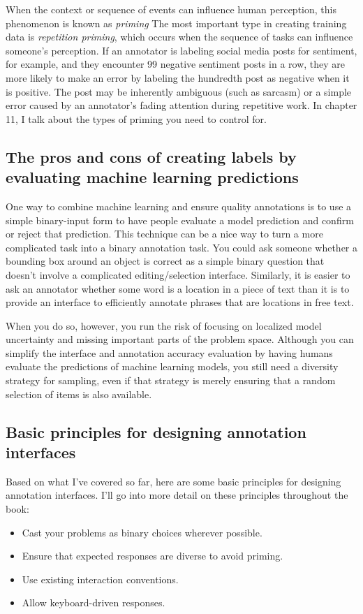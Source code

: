 \documentclass[sigconf,nonacm,screen,pbalance]{acmart}
\begin{document}
When
the context or sequence of events can influence human perception, this phenomenon is
known as {\em priming} The most important type in creating training data is
\emph{repetition priming},
which occurs when the sequence of tasks can influence someone's perception. If an
annotator is labeling social media posts for sentiment, for example, and they encounter
99 negative sentiment posts in a row, they are more likely to make an error by labeling
the hundredth post as negative when it is positive. The post may be inherently ambiguous
(such as sarcasm) or a simple error caused by an annotator's fading attention during
repetitive work. In chapter 11, I talk about the types of priming you need to control for.

\subsection{The pros and cons of creating labels by evaluating machine learning predictions}
One
way
to combine machine learning and ensure quality annotations is to use a simple
binary-input form to have people evaluate a model prediction and confirm or reject that
prediction. This technique can be a nice way to turn a more complicated task into a
binary annotation task. You could ask someone whether a bounding box around an object is
correct as a simple binary question that doesn't involve a complicated editing/selection
interface. Similarly, it is easier to ask an annotator whether some word is a location
in a piece of text than it is to provide an interface to efficiently annotate phrases
that are locations in free text.

When
you do so, however, you run the risk of focusing on localized model uncertainty and
missing important parts of the problem space. Although you can simplify the interface
and annotation accuracy evaluation by having humans evaluate the predictions of machine
learning models, you still need a diversity strategy for sampling, even if that strategy
is merely ensuring that a random selection of items is also available.

\subsection{Basic principles for designing annotation interfaces}
Based
on
what I've covered so far, here are some basic principles for designing annotation
interfaces. I'll go into more detail on these principles throughout the
book:

\begin{itemize}
     \setlength{\itemindent}{-2em}
    \item Cast your problems as binary choices wherever possible.
    \item Ensure that expected responses are diverse to avoid priming.
    \item Use existing interaction conventions.
    \item Allow keyboard-driven responses.
\end{itemize}
\end{document}

